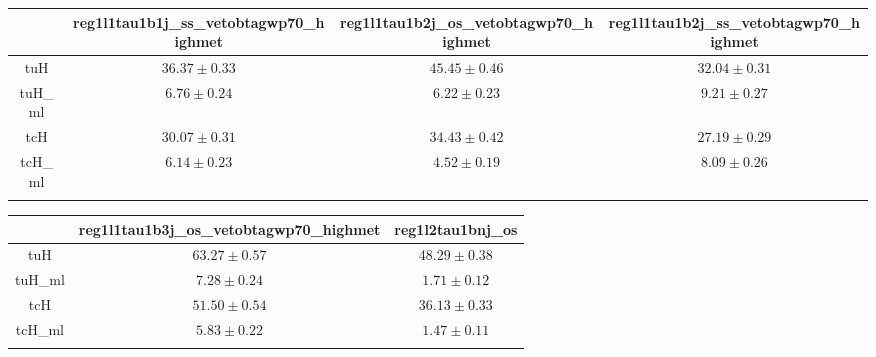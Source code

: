 \centering
\begin{tabular}{cccc} \toprule\toprule
 & reg1l1tau1b1j\_ss\_vetobtagwp70\_highmet & reg1l1tau1b2j\_os\_vetobtagwp70\_highmet & reg1l1tau1b2j\_ss\_vetobtagwp70\_highmet\\\midrule
tuH & $36.37\pm0.33$ & $45.45\pm0.46$ & $32.04\pm0.31$\\
tuH\_ml & $6.76\pm0.24$ & $6.22\pm0.23$ & $9.21\pm0.27$\\
tcH & $30.07\pm0.31$ & $34.43\pm0.42$ & $27.19\pm0.29$\\
tcH\_ml & $6.14\pm0.23$ & $4.52\pm0.19$ & $8.09\pm0.26$\\
\bottomrule\bottomrule\\
\end{tabular}
\begin{tabular}{ccc} \toprule\toprule
 & reg1l1tau1b3j\_os\_vetobtagwp70\_highmet & reg1l2tau1bnj\_os\\\midrule
tuH & $63.27\pm0.57$ & $48.29\pm0.38$\\
tuH\_ml & $7.28\pm0.24$ & $1.71\pm0.12$\\
tcH & $51.50\pm0.54$ & $36.13\pm0.33$\\
tcH\_ml & $5.83\pm0.22$ & $1.47\pm0.11$\\
\bottomrule\bottomrule\\
\end{tabular}